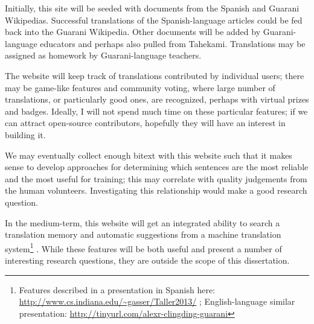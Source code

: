 Initially, this site will be seeded with documents from the Spanish and Guarani
Wikipedias. Successful translations of the Spanish-language articles could be
fed back into the Guarani Wikipedia.  Other documents will be added by
Guarani-language educators and perhaps also pulled from Tahekami. Translations
may be assigned as homework by Guarani-language teachers.

The website will keep track of translations contributed by individual users;
there may be game-like features and community voting, where large number of
translations, or particularly good ones, are recognized, perhaps with virtual
prizes and badges. Ideally, I will not spend much time on these particular
features; if we can attract open-source contributors, hopefully they will have
an interest in building it.

We may eventually collect enough bitext with this website such that it makes
sense to develop approaches for determining which sentences are the most
reliable and the most useful for training; this may correlate with quality
judgements from the human volunteers.
Investigating this relationship would make a good research question.

In the medium-term, this website will get an integrated ability to search
a translation memory and automatic suggestions from a machine translation
system\footnote{Features described in a presentation in Spanish here:
\url{http://www.cs.indiana.edu/~gasser/Taller2013/} ; English-language similar
presentation: \url{http://tinyurl.com/alexr-clingding-guarani} }
. While these features will be both useful and present a number of
interesting research questions, they are outside the scope of this
dissertation.
